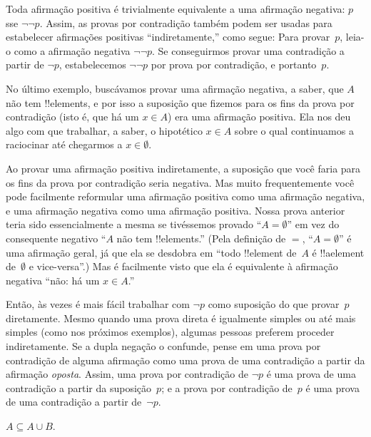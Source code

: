 \documentclass[../../../include/open-logic-section]{subfiles}
\begin{document}
Toda afirmação positiva é trivialmente equivalente a uma afirmação negativa: $p$
sse $\lnot\lnot p$.  Assim, as provas por contradição também podem ser usadas para
estabelecer afirmações positivas ``indiretamente,'' como segue: Para provar~$p$,
leia-o como a afirmação negativa $\lnot\lnot p$. Se conseguirmos provar uma
contradição a partir de $\lnot p$, estabelecemos $\lnot\lnot p$ por
prova por contradição, e portanto~$p$.

No último exemplo, buscávamos provar uma afirmação negativa, a saber, que
$A$ não tem !!{element}s, e por isso a suposição que fizemos para os fins
da prova por contradição (isto é, que há um $x \in A$) era uma
afirmação positiva. Ela nos deu algo com que trabalhar, a saber, o
hipotético $x \in A$ sobre o qual continuamos a raciocinar até chegarmos
a $x \in \emptyset$.

Ao provar uma afirmação positiva indiretamente, a suposição que você faria
para os fins da prova por contradição seria negativa. Mas muito
frequentemente você pode facilmente reformular uma afirmação positiva como uma afirmação negativa,
e uma afirmação negativa como uma afirmação positiva.  Nossa prova anterior teria
sido essencialmente a mesma se tivéssemos provado ``$A = \emptyset$''
em vez do consequente negativo ``$A$ não tem !!{element}s.'' (Pela
definição de $=$, ``$A = \emptyset$'' é uma afirmação geral, já que
ela se desdobra em ``todo !!{element} de~$A$ é !!a{element} de~$\emptyset$
e vice-versa''.) Mas é facilmente visto que ela é equivalente à
afirmação negativa ``não: há um $x \in A$.''

Então, às vezes é mais fácil trabalhar com $\lnot p$ como suposição do
que provar~$p$ diretamente.  Mesmo quando uma prova direta é igualmente
simples ou até mais simples (como nos próximos exemplos), algumas pessoas preferem
proceder indiretamente.  Se a dupla negação o confunde, pense em uma
prova por contradição de alguma afirmação como uma prova de uma contradição
a partir da afirmação \emph{oposta}. Assim, uma prova por contradição de $\lnot
p$ é uma prova de uma contradição a partir da suposição~$p$; e a prova por
contradição de~$p$ é uma prova de uma contradição a partir de~$\lnot p$.

\begin{prop}
$A \subseteq A \cup B$.
\end{prop}
\end{document}
